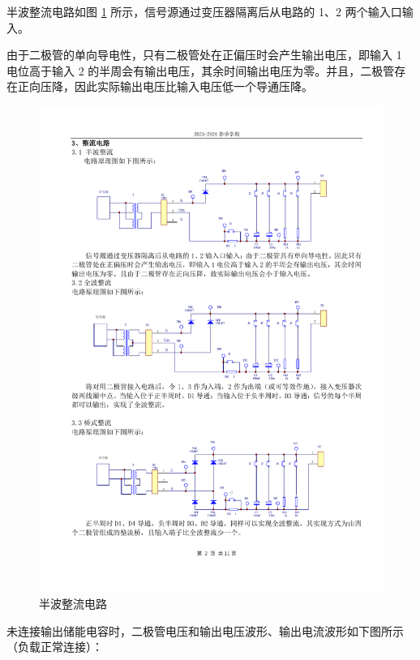 \documentclass[UTF8]{article}
\begin{document}
半波整流电路如图 \ref{fig: half-wave rectifier circuit} 所示，信号源通过变压器隔离后从电路的 1、2 两个输入口输入。

由于二极管的单向导电性，只有二极管处在正偏压时会产生输出电压，即输入 1 电位高于输入 2 的半周会有输出电压，其余时间输出电压为零。并且，二极管存在正向压降，因此实际输出电压比输入电压低一个导通压降。

\begin{figure}[H]\centering
    \includegraphics[width=0.9\columnwidth]{LCE-01-二极管/assets/实验原理/电路图 copy.pdf}
    \caption{半波整流电路}
    \label{fig: half-wave rectifier circuit}
\end{figure}

未连接输出储能电容时，二极管电压和输出电压波形、输出电流波形如下图所示（负载正常连接）：
\end{document}
